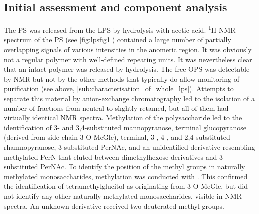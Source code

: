 \subsection{Initial assessment and component analysis} %
\label{sub:initial_assessment_and_component_analysis}

The \ac{PS} was released from the \ac{LPS} by hydrolysis with acetic acid. \textsuperscript{1}H
\ac{NMR} spectrum of the \ac{PS} (see \cref{fig:lpsfig1}) contained a large number of partially
overlapping signals of various intensities in the anomeric region. It was obviously not a regular
polymer with well-defined repeating units. It was nevertheless clear that an intact polymer was released by hydrolysis. The free-\ac{OPS} was detectable by \ac{NMR} but not by the other methods that typically do allow monitoring of  purification (see above, \cref{sub:characterisation_of_whole_lps}). Attempts to separate this material by anion-exchange
chromatography led to the isolation of a number of fractions from neutral to slightly retained,
but all of them had virtually identical \ac{NMR} spectra. Methylation of the polysaccharide led to
the identification of 3- and 3,4-substituted mannopyranose, terminal glucopyranose (derived from
side-chain 3-O-MeGlc), terminal, 3-, 4-, and 2,4-substituted rhamnopyranose, 3-substituted PerNAc,
and an unidentified derivative resembling methylated PerN that eluted between dimethylhexose
derivatives and 3-substituted PerNAc. To identify the position of the methyl groups in naturally
methylated monosaccharides, methylation was conducted with . This confirmed the
identification of tetramethylglucitol as originating from 3-O-MeGlc, but did not identify any
other naturally methylated monosaccharides, visible in \ac{NMR} spectra. An unknown derivative
received two deuterated methyl groups.

